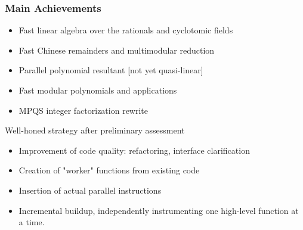 \documentclass{beamer}
\begin{document}

\begin{frame} \frametitle{Main Achievements}
  \begin{itemize}
    \item  Fast linear algebra over the rationals and cyclotomic fields
    \item  Fast Chinese remainders and multimodular reduction
    \item Parallel polynomial resultant [not yet quasi-linear]
    \item  Fast modular polynomials and applications%
     \item  MPQS integer factorization rewrite

  \end{itemize}
  \begin{block}   {Well-honed strategy after preliminary assessment}
    \begin{itemize}
    \item Improvement of code quality: refactoring, interface clarification
    \item Creation of "worker" functions from existing code
    \item Insertion of actual parallel instructions
    \item Incremental buildup, independently instrumenting one high-level function at a time. 
    \end{itemize}
  \end{block}

\end{frame}


\end{document}
